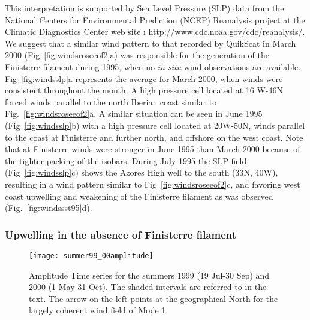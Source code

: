 This interpretation is supported by Sea Level Pressure (SLP) data
from the National Centers for Environmental Prediction (NCEP)
Reanalysis project at the Climatic Diagnostics Center web site {\i
http://www.cdc.noaa.gov/cdc/reanalysis/}. We suggest that a
similar wind pattern to that recorded by QuikScat in March 2000
(Fig~\ref{fig:windsroseeof2}a) was responsible for the generation
of the Finisterre filament during 1995, when no \emph{in situ}
wind observations are available. {Fig~\ref{fig:windsslp}}a
represents the average for March 2000, when winds were consistent
throughout the month. A high pressure cell located at 16\deg
W-46\deg N forced winds parallel to the north Iberian coast
similar to Fig.~\ref{fig:windsroseeof2}a. A similar situation can
be seen in June 1995 (Fig~\ref{fig:windsslp}b) with a high
pressure cell located at 20\deg W-50\deg N, winds parallel to the
coast at Finisterre and further north, and offshore on the west
coast. Note that at Finisterre winds were stronger in June 1995
than March 2000 because of the tighter packing of the isobars.
During July 1995 the SLP field (Fig~\ref{fig:windsslp}c) shows the
Azores High well to the south (33\deg N, 40\deg W), resulting in a
wind pattern similar to Fig~\ref{fig:windsroseeof2}c, and favoring
west coast upwelling and weakening of the Finisterre filament as
was observed (Fig.~\ref{fig:windssst95}d).

\subsubsection{Upwelling in the absence of Finisterre filament}
\label{nofinisterre}
\begin{figure}
\texttt{[image: summer99\_00amplitude]}
\caption{Amplitude Time series for the summers 1999 (19 Jul-30
Sep) and 2000 (1 May-31 Oct). The shaded intervals are referred to
in the text. The arrow on the left points at the geographical
North for the largely coherent wind field of Mode 1.}
\label{fig:windsamp9900}
\end{figure}

